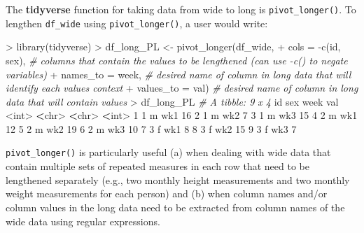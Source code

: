 \documentclass[
]{book}
\newenvironment{Shaded}{\begin{snugshade}}{\end{snugshade}}
\newcommand{\AttributeTok}[1]{\textcolor[rgb]{0.77,0.63,0.00}{#1}}
\newcommand{\CommentTok}[1]{\textcolor[rgb]{0.56,0.35,0.01}{\textit{#1}}}
\newcommand{\DecValTok}[1]{\textcolor[rgb]{0.00,0.00,0.81}{#1}}
\newcommand{\ErrorTok}[1]{\textcolor[rgb]{0.64,0.00,0.00}{\textbf{#1}}}
\newcommand{\FunctionTok}[1]{\textcolor[rgb]{0.00,0.00,0.00}{#1}}
\newcommand{\NormalTok}[1]{#1}
\newcommand{\OtherTok}[1]{\textcolor[rgb]{0.56,0.35,0.01}{#1}}
\newcommand{\SpecialCharTok}[1]{\textcolor[rgb]{0.00,0.00,0.00}{#1}}
\newcommand{\StringTok}[1]{\textcolor[rgb]{0.31,0.60,0.02}{#1}}
\begin{document}
The \textbf{tidyverse} function for taking data from wide to long is \texttt{pivot\_longer()}. To lengthen \texttt{df\_wide} using \texttt{pivot\_longer()}, a user would write:

\begin{Shaded}
\begin{Highlighting}[]
\SpecialCharTok{\textgreater{}} \FunctionTok{library}\NormalTok{(tidyverse)}
\SpecialCharTok{\textgreater{}}\NormalTok{ df\_long\_PL }\OtherTok{\textless{}{-}} \FunctionTok{pivot\_longer}\NormalTok{(df\_wide,}
\SpecialCharTok{+}                              \AttributeTok{cols =} \SpecialCharTok{{-}}\FunctionTok{c}\NormalTok{(}\StringTok{\textquotesingle{}id\textquotesingle{}}\NormalTok{, }\StringTok{\textquotesingle{}sex\textquotesingle{}}\NormalTok{), }\CommentTok{\# columns that contain the values to be lengthened (can use {-}c() to negate variables)}
\SpecialCharTok{+}                              \AttributeTok{names\_to =} \StringTok{\textquotesingle{}week\textquotesingle{}}\NormalTok{, }\CommentTok{\# desired name of column in long data that will identify each value\textquotesingle{}s context}
\SpecialCharTok{+}                              \AttributeTok{values\_to =} \StringTok{\textquotesingle{}val\textquotesingle{}}\NormalTok{) }\CommentTok{\# desired name of column in long data that will contain values}
\SpecialCharTok{\textgreater{}}\NormalTok{ df\_long\_PL}
\CommentTok{\# A tibble: 9 x 4}
\NormalTok{     id sex   week    val}
  \SpecialCharTok{\textless{}}\NormalTok{int}\SpecialCharTok{\textgreater{}} \ErrorTok{\textless{}}\NormalTok{chr}\SpecialCharTok{\textgreater{}} \ErrorTok{\textless{}}\NormalTok{chr}\SpecialCharTok{\textgreater{}} \ErrorTok{\textless{}}\NormalTok{int}\SpecialCharTok{\textgreater{}}
\DecValTok{1}     \DecValTok{1}\NormalTok{ m     wk1      }\DecValTok{16}
\DecValTok{2}     \DecValTok{1}\NormalTok{ m     wk2       }\DecValTok{7}
\DecValTok{3}     \DecValTok{1}\NormalTok{ m     wk3      }\DecValTok{15}
\DecValTok{4}     \DecValTok{2}\NormalTok{ m     wk1      }\DecValTok{12}
\DecValTok{5}     \DecValTok{2}\NormalTok{ m     wk2      }\DecValTok{19}
\DecValTok{6}     \DecValTok{2}\NormalTok{ m     wk3      }\DecValTok{10}
\DecValTok{7}     \DecValTok{3}\NormalTok{ f     wk1       }\DecValTok{8}
\DecValTok{8}     \DecValTok{3}\NormalTok{ f     wk2      }\DecValTok{15}
\DecValTok{9}     \DecValTok{3}\NormalTok{ f     wk3       }\DecValTok{7}
\end{Highlighting}
\end{Shaded}

\texttt{pivot\_longer()} is particularly useful (a) when dealing with wide data that contain multiple sets of repeated measures in each row that need to be lengthened separately (e.g., two monthly height measurements and two monthly weight measurements for each person) and (b) when column names and/or column values in the long data need to be extracted from column names of the wide data using regular expressions.
\end{document}
